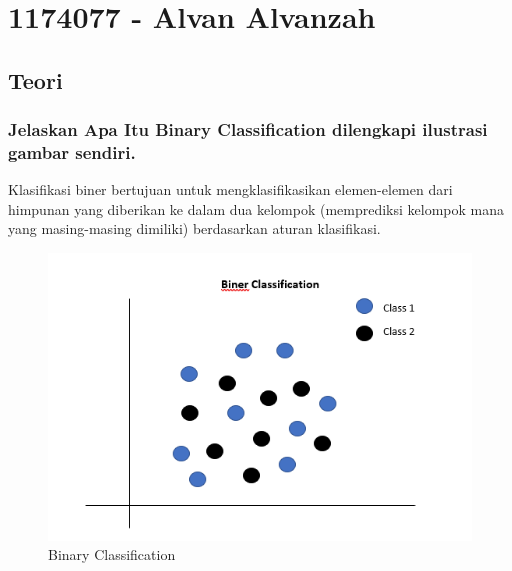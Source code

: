 \section{1174077 - Alvan Alvanzah}
\subsection{Teori}
\subsubsection{Jelaskan Apa Itu Binary Classification dilengkapi ilustrasi gambar sendiri.}

Klasifikasi biner bertujuan untuk mengklasifikasikan elemen-elemen dari himpunan yang diberikan ke dalam dua kelompok (memprediksi kelompok mana yang masing-masing dimiliki) berdasarkan aturan klasifikasi. 
\hfill\\
\begin{figure}[H]
    \includegraphics[width=12cm]{figures/1174077/2/kb.png}
    \centering
    \caption{Binary Classification}
\end{figure}

